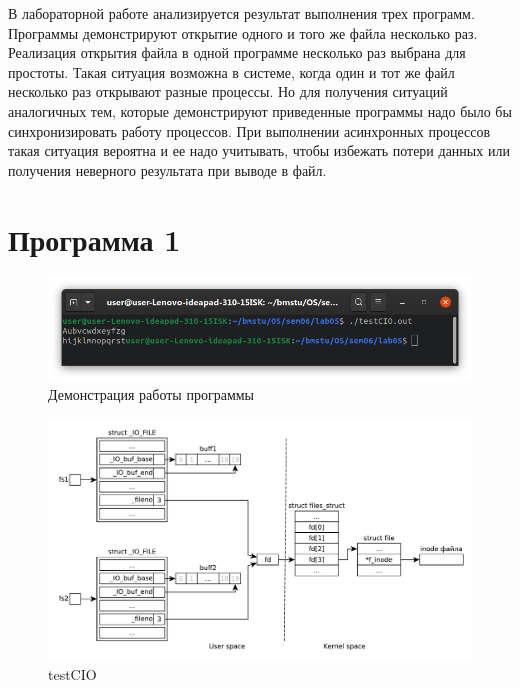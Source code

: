 \documentclass[a4paper,oneside,12pt]{extreport}
\begin{document}


\begin{task*}
	В лабораторной работе анализируется результат выполнения трех программ.
	Программы демонстрируют открытие одного и того же файла несколько раз.
	Реализация открытия файла в одной программе несколько раз выбрана для простоты.
	Такая ситуация возможна в системе, когда один и тот же файл несколько раз открывают разные процессы.
	Но для получения ситуаций аналогичных тем, которые демонстрируют приведенные программы надо было бы синхронизировать работу процессов.
	При выполнении асинхронных процессов такая ситуация вероятна и ее надо учитывать, чтобы избежать потери данных или получения неверного результата при выводе в файл.
\end{task*}

\section*{Программа 1}



\begin{figure}[H]
	\centering
	\includegraphics[width=\linewidth]{inc/img/testCIO-runtime}
	\caption{Демонстрация работы программы }
	\label{img:testCIO-runtime}
\end{figure}

\begin{figure}[H]
	\centering
	\includegraphics[scale=0.65]{inc/img/testCIO}
	\caption{testCIO}
	\label{img:testCIO}
\end{figure}
\end{document}
